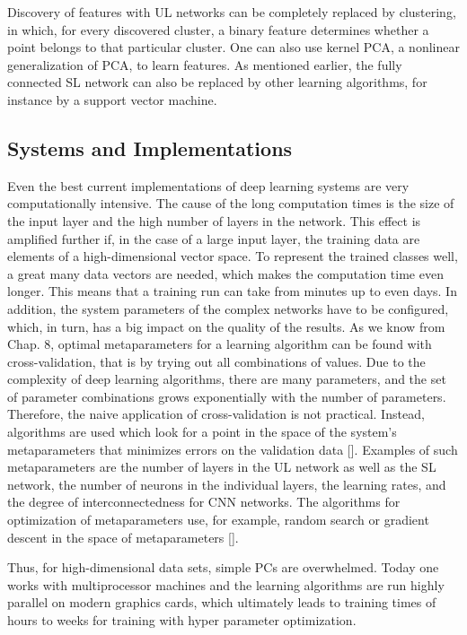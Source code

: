 \documentclass[10pt]{book}
\begin{document}
Discovery of features with UL networks can be completely replaced by clustering, in which, for every discovered cluster, a binary feature determines whether a point belongs to that particular cluster. One can also use kernel PCA, a nonlinear generalization of PCA, to learn features. As mentioned earlier, the fully connected SL network can also be replaced by other learning algorithms, for instance by a support vector machine.

\subsection{Systems and Implementations}
Even the best current implementations of deep learning systems are very computationally intensive. The cause of the long computation times is the size of the input layer and the high number of layers in the network. This effect is amplified further if, in the case of a large input layer, the training data are elements of a high-dimensional vector space. To represent the trained classes well, a great many data vectors are needed, which makes the computation time even longer.
This means that a training run can take from minutes up to even days. In addition, the system parameters of the complex networks have to be configured, which, in turn, has a big impact on the quality of the results. As we know from Chap. 8, optimal metaparameters for a learning algorithm can be found with cross-validation, that is by trying out all combinations of values. Due to the complexity of deep learning algorithms, there are many parameters, and the set of parameter combinations grows exponentially with the number of parameters. Therefore, the naive application of cross-validation is not practical. Instead, algorithms are used which look for a point in the space of the system's metaparameters that minimizes errors on the validation data [\cite{bergstra2011algorithms}]. Examples of such metaparameters are the number of layers in the UL network as well as the SL network, the number of neurons in the individual layers, the learning rates, and the degree of interconnectedness for CNN networks. The algorithms for optimization of metaparameters use, for example, random search or gradient descent in the space of metaparameters [\cite{maclaurin2015reversible}].

Thus, for high-dimensional data sets, simple PCs are overwhelmed. Today one works with multiprocessor machines and the learning algorithms are run highly parallel on modern graphics cards, which ultimately leads to training times of hours to weeks for training with hyper parameter optimization.
\end{document}
